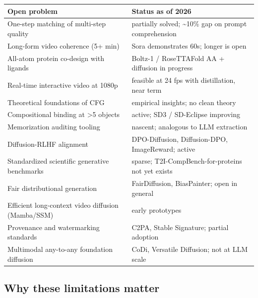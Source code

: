 {\def\LTcaptype{none} %
\begin{longtable}[]{@{}
  >{\raggedright\arraybackslash}p{}
  >{\raggedright\arraybackslash}p{}@{}}
\toprule\noalign{}
\begin{minipage}[b]{\linewidth}\raggedright
Open problem
\end{minipage} & \begin{minipage}[b]{\linewidth}\raggedright
Status as of 2026
\end{minipage} \\
\midrule\noalign{}
\endhead
\bottomrule\noalign{}
\endlastfoot
One-step matching of multi-step quality & partially solved; \textasciitilde10\% gap on prompt comprehension \\
Long-form video coherence (5+ min) & Sora demonstrates 60s; longer is open \\
All-atom protein co-design with ligands & Boltz-1 / RoseTTAFold AA + diffusion in progress \\
Real-time interactive video at 1080p & feasible at 24 fps with distillation, near term \\
Theoretical foundations of CFG & empirical insights; no clean theory \\
Compositional binding at \textgreater5 objects & active; SD3 / SD-Eclipse improving \\
Memorization auditing tooling & nascent; analogous to LLM extraction \\
Diffusion-RLHF alignment & DPO-Diffusion, Diffusion-DPO, ImageReward; active \\
Standardized scientific generative benchmarks & sparse; T2I-CompBench-for-proteins not yet exists \\
Fair distributional generation & FairDiffusion, BiasPainter; open in general \\
Efficient long-context video diffusion (Mamba/SSM) & early prototypes \\
Provenance and watermarking standards & C2PA, Stable Signature; partial adoption \\
Multimodal any-to-any foundation diffusion & CoDi, Versatile Diffusion; not at LLM scale \\
\end{longtable}
}

\subsection{Why these limitations matter}\label{why-these-limitations-matter}

